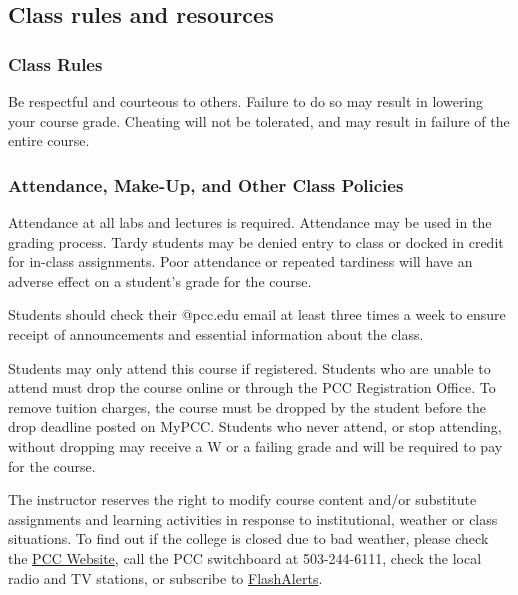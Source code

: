 \documentclass[11pt]{article}
\begin{document}
    \hypertarget{class-rules-and-resources}{%
\subsection{Class rules and resources}\label{class-rules-and-resources}}

\hypertarget{class-rules}{%
\subsubsection{Class Rules}\label{class-rules}}

Be respectful and courteous to others. Failure to do so may result in
lowering your course grade. Cheating will not be tolerated, and may
result in failure of the entire course.

\hypertarget{attendance-make-up-and-other-class-policies}{%
\subsubsection{Attendance, Make-Up, and Other Class
Policies}\label{attendance-make-up-and-other-class-policies}}

Attendance at all labs and lectures is required. Attendance may be used
in the grading process. Tardy students may be denied entry to class or
docked in credit for in-class assignments. Poor attendance or repeated
tardiness will have an adverse effect on a student's grade for the
course.

Students should check their @pcc.edu email at least three times a week
to ensure receipt of announcements and essential information about the
class.

Students may only attend this course if registered. Students who are
unable to attend must drop the course online or through the PCC
Registration Office. To remove tuition charges, the course must be
dropped by the student before the drop deadline posted on MyPCC.
Students who never attend, or stop attending, without dropping may
receive a W or a failing grade and will be required to pay for the
course.

The instructor reserves the right to modify course content and/or
substitute assignments and learning activities in response to
institutional, weather or class situations. To find out if the college
is closed due to bad weather, please check the
\href{http://www.pcc.edu/}{PCC Website}, call the PCC switchboard at
503-244-6111, check the local radio and TV stations, or subscribe to
\href{https://www.pcc.edu/about/announcements/closure-information.html}{FlashAlerts}.
\end{document}
